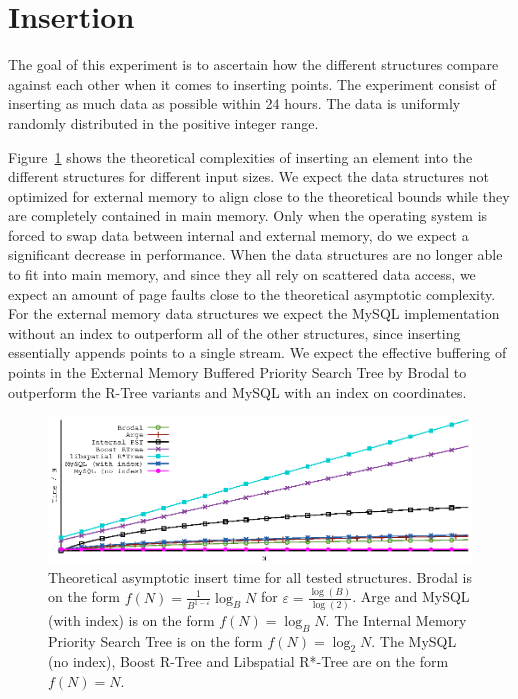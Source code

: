 \documentclass[twoside,11pt,openright]{report}
\def \epsilon {\varepsilon}
\begin{document}
\clearpage

\section{Insertion}
\label{sec:insertion}
The goal of this experiment is to ascertain how the different structures compare against each other when it comes to inserting points. The experiment consist of inserting as much data as possible within 24 hours. The data is uniformly randomly distributed in the positive integer range.

Figure~\ref{fig:theory_insert_complexity} shows the theoretical complexities of inserting an element into the different structures for different input sizes. We expect the data structures not optimized for external memory to align close to the theoretical bounds while they are completely contained in main memory. Only when the operating system is forced to swap data between internal and external memory, do we expect a significant decrease in performance. When the data structures are no longer able to fit into main memory, and since they all rely on scattered data access, we expect an amount of page faults close to the theoretical asymptotic complexity. For the external memory data structures we expect the MySQL implementation without an index to outperform all of the other structures, since inserting essentially appends points to a single stream. We expect the effective buffering of points in the External Memory Buffered Priority Search Tree by Brodal to outperform the R-Tree variants and MySQL with an index on coordinates.

\begin{figure}[h]
\centering
\includegraphics[width=\textwidth]{../plots/insert_complexities/insert_complexity}
\caption{Theoretical asymptotic insert time for all tested structures. Brodal is on the form $f(N) = \frac{1}{B^{1-\epsilon}} \log_B N$ for $\epsilon = \frac{\log(B)}{\log(2)}$. Arge and MySQL (with index) is on the form $f(N) = \log_B N$. The Internal Memory Priority Search Tree is on the form $f(N) = \log_2 N$. The MySQL (no index), Boost R-Tree and Libspatial R*-Tree are on the form $f(N) = N$.}
\label{fig:theory_insert_complexity}
\end{figure}
\end{document}
